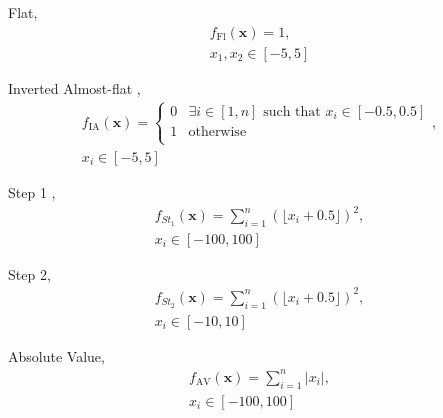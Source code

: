 \documentclass[conference]{IEEEtran}
\renewcommand{\vec}[1]{\mathbf{#1}}
\begin{document}
Flat,
\begin{multline}
\label{eqFlat}
	f_{\text{Fl}}(\vec{x})= 1,\\
	x_1, x_2 \in [-5,5]		
\end{multline}

Inverted Almost-flat \cite{malan2014characterising},
\begin{multline}
\label{eqAlmostFlat}
	f_{\text{IA}}(\vec{x}) = \begin{cases} 
								0 & \exists i \in [1,n] \text{ such that } x_i \in [-0.5, 0.5] \\
								1 & \text{otherwise} \\							
						     \end{cases},\\
	x_i \in [-5,5] 		
\end{multline}

Step 1 \cite{malan2009quantifying},
\begin{multline}
\label{eqStep1}
	f_{\textit{St}_1}(\vec{x}) = \sum_{i=1}^{n} (\lfloor x_i + 0.5 \rfloor)^2,\\
	x_i \in [-100,100]
\end{multline}

Step 2, 
\begin{multline}
\label{eqStep2}
	f_{\textit{St}_2}(\vec{x}) = \sum_{i=1}^{n} (\lfloor x_i + 0.5 \rfloor)^2,\\
	x_i \in [-10,10] 	
\end{multline}

Absolute Value,
\begin{multline}
\label{eqAbsoluteValue}
	f_{\text{AV}}(\vec{x}) = \sum_{i=1}^{n} \left| x_i \right|,\\
	x_i \in [-100,100] 	
\end{multline}
\end{document}
